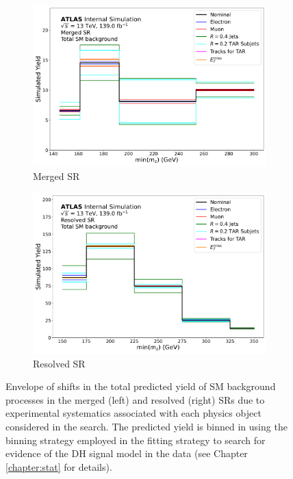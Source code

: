 \begin{figure}[htbp]
  \centering
    \begin{subfigure}[t]{0.48\textwidth}
    \centering
     \includegraphics[width = 0.99\textwidth]{Figures/6/exp_systs_total_bkg_SR_mgd_TARJets10_minmS_mgd.pdf}
    \caption{Merged SR}
    \end{subfigure}
    \begin{subfigure}[t]{0.48\textwidth}
    \centering
     \includegraphics[width = 0.99\textwidth]{Figures/6/exp_systs_total_bkg_SR_res_TARJets10_minmS_res.pdf}
     \caption{Resolved SR}
    \end{subfigure}
    \caption{Envelope of shifts in the total predicted yield of SM background processes in the merged (left) and resolved (right) SRs due to experimental systematics associated with each physics object considered in the search. The predicted yield is binned in \minms using the binning strategy employed in the fitting strategy to search for evidence of the DH signal model in the data (see Chapter \ref{chapter:stat} for details). }
   \label{fig:exp_syst_shifts_bkg}
\end{figure}

